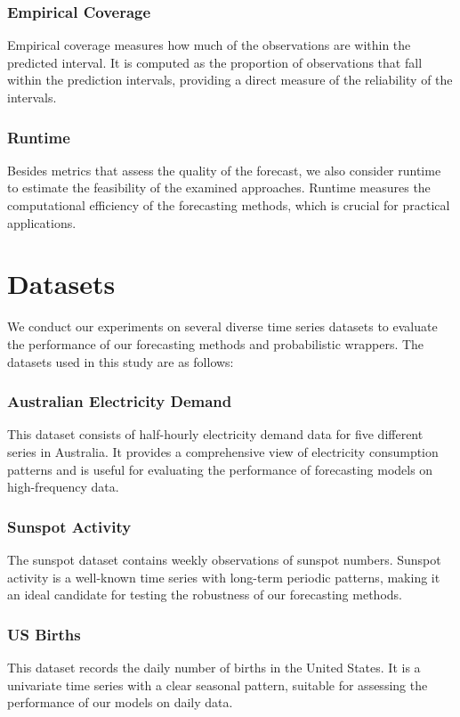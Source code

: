 \documentclass{article}
\begin{document}
\subsubsection{Empirical Coverage}
Empirical coverage measures how much of the observations are within the predicted interval. It is computed as the proportion of observations that fall within the prediction intervals, providing a direct measure of the reliability of the intervals.

\subsubsection{Runtime}
Besides metrics that assess the quality of the forecast, we also consider runtime to estimate the feasibility of the examined approaches. Runtime measures the computational efficiency of the forecasting methods, which is crucial for practical applications.

\section{Datasets} \label{datasets}
We conduct our experiments on several diverse time series datasets to evaluate the performance of our forecasting methods and probabilistic wrappers. The datasets used in this study are as follows:

\subsubsection{Australian Electricity Demand}
This dataset consists of half-hourly electricity demand data for five different series in Australia. It provides a comprehensive view of electricity consumption patterns and is useful for evaluating the performance of forecasting models on high-frequency data.

\subsubsection{Sunspot Activity}
The sunspot dataset contains weekly observations of sunspot numbers. Sunspot activity is a well-known time series with long-term periodic patterns, making it an ideal candidate for testing the robustness of our forecasting methods.

\subsubsection{US Births}
This dataset records the daily number of births in the United States. It is a univariate time series with a clear seasonal pattern, suitable for assessing the performance of our models on daily data.
\end{document}

